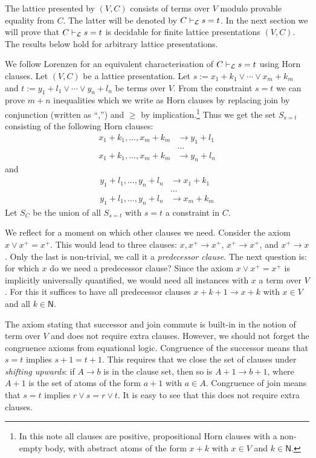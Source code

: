 \documentclass[11pt,a4paper]{article}
\newcommand{\N}{\mathsf{N}}
\newcommand\jterm[3]{{{#1_1}+{#2_1}}\vee\cdots\vee{{#1_#3}+{#2_#3}}}
\newcommand\jbody[3]{{{#1_1}+{#2_1}},\ldots,{{#1_#3}+{#2_#3}}}
\newcommand\lathy{{\cal L}}
\newcommand\prvL{\vdash_{\lathy}}
\begin{document}
The lattice presented by $(V,C)$ consists of terms over $V$
modulo provable equality from $C$. The latter will be denoted
by $C\prvL s=t$. In the next section we will prove that
$C\prvL s=t$ is decidable for finite lattice presentations $(V,C)$.
The results below hold for arbitrary lattice presentations.

We follow Lorenzen \cite[Section 2]{Lorenzen51} for an equivalent 
characterisation of $C\prvL s=t$ using Horn clauses.
Let $(V,C)$ be a lattice presentation.
Let $s:= \jterm{x}{k}{m}$ and $t:= \jterm{y}{l}{n}$ be
terms over $V$. From the constraint $s=t$
we can prove $m+n$ inequalities which we write as
Horn clauses by replacing join by conjunction (written as ``,'') and $\geq$
by implication.\footnote{In this note all clauses are positive,
propositional Horn clauses with a non-empty body,
with abstract atoms of the form $x+k$ with $x\in V$ and $k\in \N$.} 
Thus we get the set $S_{s=t}$ consisting of the following Horn clauses:
\begin{align*}
\jbody{x}{k}{m} &\to y_1+l_1 \\
&\ldots  \\
\jbody{x}{k}{m} &\to y_n+l_n 
\end{align*}
and
\begin{align*}
\jbody{y}{l}{n} &\to x_1+k_1 \\
&\ldots \\
\jbody{y}{l}{n} &\to x_m+k_m 
\end{align*}
Let $S_C$ be the union of all $S_{s=t}$ with $s=t$ 
a constraint in $C$.

We reflect for a moment on which other clauses we need.
Consider the axiom $x \vee x^+ = x^+$. This would lead to three
clauses: $x,x^+ \to x^+$, $x^+ \to x^+$, and $x^+ \to x$.
Only the last is non-trivial, we call it a \emph{predecessor clause}.
The next question is: for which $x$ do we need a predecessor clause?
Since the axiom $x \vee x^+ = x^+$ is implicitly universally quantified,
we would need all instances with $x$ a term over $V$.
For this it suffices to have all predecessor clauses
$x+k+1 \to x+k$ with $x\in V$ and all $k\in \N$.

The axiom stating that successor and join commute is built-in
in the notion of term over $V$ and does not require extra clauses.
However, we should not forget the congruence axioms from
equational logic. Congruence of the successor means that $s=t$
implies $s+1=t+1$. This requires that we close the set of clauses
under \emph{shifting upwards}: if $A\to b$ is in the clause set,
then so is $A+1\to b+1$, where $A+1$ is the set of atoms of
the form $a+1$ with $a\in A$. 
Congruence of join means that $s=t$ implies $r\vee s=r\vee t$.
It is easy to see that this does not require extra clauses. 
\end{document}
